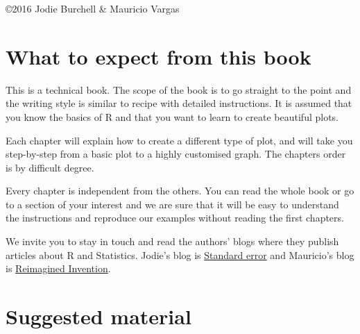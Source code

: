 \documentclass[11pt, oneside]{report}
\begin{document}
\copyright 2016 Jodie Burchell \& Mauricio Vargas

\newpage
\tableofcontents
\newpage

%
%


\setcounter{page}{1}

\chapter*{What to expect from this book}

This is a technical book. The scope of the book is to go straight to the point and the writing style is similar to recipe with detailed instructions. It is assumed that you know the basics of R and that you want to learn to create beautiful plots. 

Each chapter will explain how to create a different type of plot, and will take you step-by-step from a basic plot to a highly customised graph. The chapters order is by difficult degree.

Every chapter is independent from the others. You can read the whole book or go to a section of your interest and we are sure that it will be easy to understand the instructions and reproduce our examples without reading the first chapters.

We invite you to stay in touch and read the authors' blogs where they publish articles about R and Statistics. Jodie's blog is \href{http://t-redactyl.io/}{Standard error} and Mauricio's blog is \href{http://pachamaltese.github.io/}{Reimagined Invention}.













\chapter*{Suggested material}
%
\end{document}
